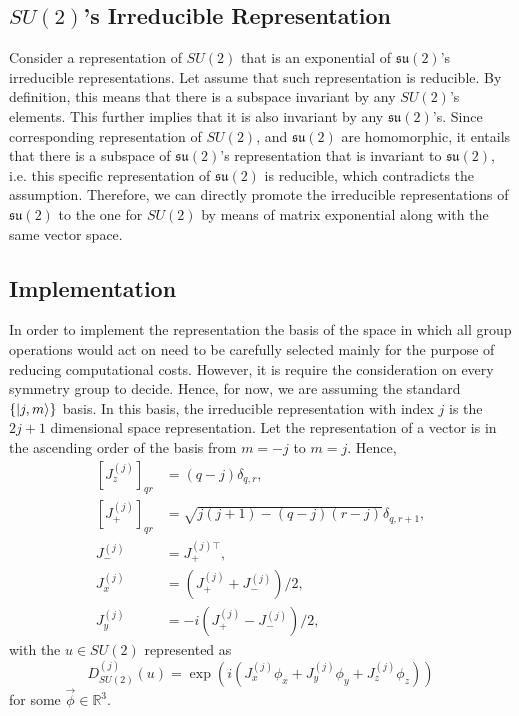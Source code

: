 \documentclass[preprint, 12pt]{revtex4-2}
\numberwithin{equation}{section}
\begin{document}
\subsection{$SU(2)$'s Irreducible Representation}
Consider a representation of $SU(2)$ that is an exponential of $\mathfrak{su(2)}$'s irreducible representations. Let assume that such representation is reducible. By definition, this means that there is a subspace invariant by any $SU(2)$'s elements. This further implies that it is also invariant by any $\mathfrak{su(2)}$'s. Since corresponding representation of $SU(2)$, and $\mathfrak{su(2)}$ are homomorphic, it entails that there is a subspace of $\mathfrak{su(2)}$'s representation that is invariant to $\mathfrak{su(2)}$, i.e. this specific representation of $\mathfrak{su(2)}$ is reducible, which contradicts the assumption. Therefore, we can directly promote the irreducible representations of $\mathfrak{su(2)}$ to the one for $SU(2)$ by means of matrix exponential along with the same vector space.

\subsection{Implementation}
In order to implement the representation the basis of the space in which all group operations would act on need to be carefully selected mainly for the purpose of reducing computational costs. However, it is require the consideration on every symmetry group to decide. Hence, for now, we are assuming the standard $\{\ket{j, m}\}$ basis. In this basis, the irreducible representation with index $j$ is the $2j+1$ dimensional space representation. Let the representation of a vector is in the ascending order of the basis from $m = -j$ to $m = j$. Hence,
\begin{equation}
    \begin{aligned}
        \left[J_z^{(j)}\right]_{qr} &= (q-j)\delta_{q,r}, \\
        \left[J_+^{(j)}\right]_{qr} &= \sqrt{j(j+1)-(q-j)(r-j)}\delta_{q,r+1}, \\
        J_-^{(j)} &= J_+^{(j)\top}, \\
        J_x^{(j)} &= \left(J_+^{(j)}+J_-^{(j)}\right)/2, \\
        J_y^{(j)} &= -i\left(J_+^{(j)}-J_-^{(j)}\right)/2,
    \end{aligned}
\end{equation}
with the $u\in SU(2)$ represented as
\begin{equation}
    D^{(j)}_{SU(2)}(u) = \exp(i(J_x^{(j)}\phi_x+J_y^{(j)}\phi_y+J_z^{(j)}\phi_z))
\end{equation}
for some $\vec{\phi}\in\mathbb{R}^3$.
\end{document}
